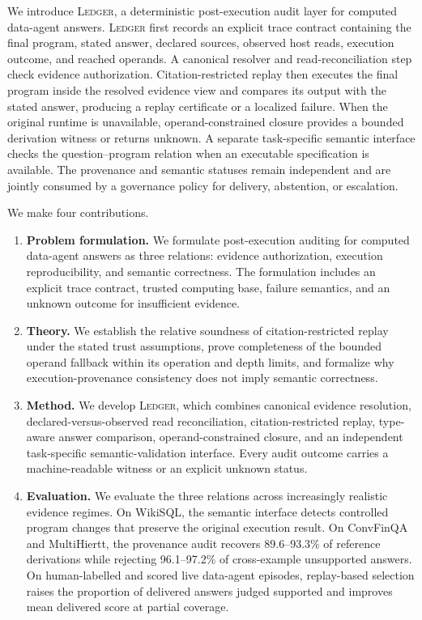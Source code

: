 \documentclass[5p,times]{elsarticle}
\newcommand{\ledger}{\textsc{Ledger}\xspace}
\begin{document}
We introduce \ledger, a deterministic post-execution audit layer
for computed data-agent answers. \ledger first records an explicit
trace contract containing the final program, stated answer, declared
sources, observed host reads, execution outcome, and reached
operands. A canonical resolver and read-reconciliation step check
evidence authorization. Citation-restricted replay then executes the
final program inside the resolved evidence view and compares its
output with the stated answer, producing a replay certificate or a
localized failure. When the original runtime is unavailable,
operand-constrained closure provides a bounded derivation witness or
returns unknown. A separate task-specific semantic interface checks
the question--program relation when an executable specification is
available. The provenance and semantic statuses remain independent
and are jointly consumed by a governance policy for delivery,
abstention, or escalation.

We make four contributions.
\begin{enumerate}
    \setlength{\itemsep}{0pt}
    \setlength{\parskip}{0pt}

    \item \textbf{Problem formulation.}
    We formulate post-execution auditing for computed data-agent
    answers as three relations: evidence authorization, execution
    reproducibility, and semantic correctness. The formulation
    includes an explicit trace contract, trusted computing base,
    failure semantics, and an unknown outcome for insufficient
    evidence.

    \item \textbf{Theory.}
    We establish the relative soundness of citation-restricted
    replay under the stated trust assumptions, prove completeness
    of the bounded operand fallback within its operation and depth
    limits, and formalize why execution-provenance consistency does
    not imply semantic correctness.

    \item \textbf{Method.}
    We develop \ledger, which combines canonical evidence
    resolution, declared-versus-observed read reconciliation,
    citation-restricted replay, type-aware answer comparison,
    operand-constrained closure, and an independent task-specific
    semantic-validation interface. Every audit outcome carries a
    machine-readable witness or an explicit unknown status.

    \item \textbf{Evaluation.}
    We evaluate the three relations across increasingly realistic
    evidence regimes. On WikiSQL, the semantic interface detects
    controlled program changes that preserve the original execution
    result. On ConvFinQA and MultiHiertt, the provenance audit
    recovers 89.6--93.3\% of reference derivations while rejecting
    96.1--97.2\% of cross-example unsupported answers. On
    human-labelled and scored live data-agent episodes, replay-based
    selection raises the proportion of delivered answers judged
    supported and improves mean delivered score at partial coverage.
\end{enumerate}
\end{document}
